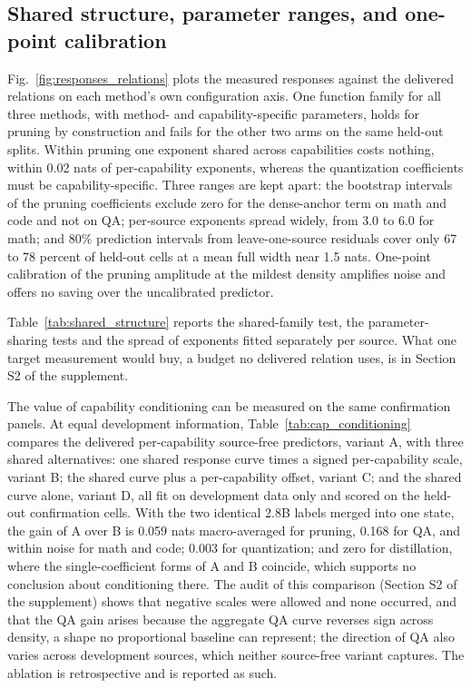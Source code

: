 \subsection{Shared structure, parameter ranges, and one-point calibration}
\label{sec:app_shared}

Fig.~\ref{fig:responses_relations} plots the measured responses against the delivered relations on
each method's own configuration axis. One function
family for all three methods, with method- and capability-specific
parameters, holds for pruning by construction and fails for the other two arms on
the same held-out splits. Within pruning one exponent shared across capabilities costs nothing, within 0.02 nats of per-capability exponents, whereas the quantization coefficients must be capability-specific. Three ranges are kept apart: the bootstrap intervals of the pruning coefficients exclude zero for
the dense-anchor term on math and code and not on QA; per-source exponents spread widely, from 3.0 to 6.0 for math; and 80\% prediction intervals from leave-one-source residuals cover only 67 to 78 percent of held-out cells at a mean full width near 1.5 nats. One-point calibration of the pruning amplitude at the mildest density
amplifies noise and offers no saving over the uncalibrated predictor.

Table~\ref{tab:shared_structure} reports the shared-family test, the parameter-sharing tests and
the spread of exponents fitted separately per source. What one target measurement would buy, a
budget no delivered relation uses, is in Section S2 of the supplement.


The value of capability conditioning can be measured on the same confirmation panels. At equal
development information, Table~\ref{tab:cap_conditioning}
compares the delivered per-capability source-free predictors, variant A, with three shared alternatives: one shared response curve times a signed per-capability scale, variant B; the shared curve plus a per-capability offset, variant C; and the shared curve alone, variant D, all fit on development data only and scored on the
held-out confirmation cells. With the two identical 2.8B labels merged into one state, the gain of A over B is 0.059 nats macro-averaged for pruning, 0.168 for QA, and within noise for math and code; 0.003 for quantization; and zero for distillation, where the single-coefficient forms of A and B coincide, which
supports no conclusion about conditioning there. The audit of this
comparison (Section S2 of the supplement) shows that negative scales were allowed
and none occurred, and that the QA gain arises because the aggregate
QA curve reverses sign across density, a shape no proportional
baseline can represent; the direction of QA also varies across
development sources, which neither source-free variant captures. The ablation is retrospective and is reported as such.

